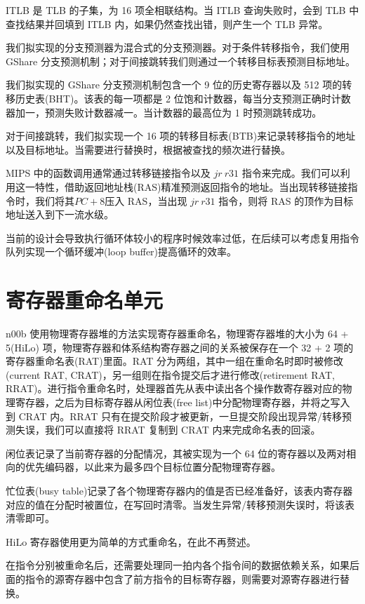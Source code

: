 \documentclass[blue,normal,cn]{elegantnote}
\begin{document}
ITLB 是 TLB 的子集，为 16 项全相联结构。当 ITLB 查询失败时，会到 TLB 中查找结果并回填到 ITLB 内，如果仍然查找出错，则产生一个 TLB 异常。

我们拟实现的分支预测器为混合式的分支预测器。对于条件转移指令，我们使用 GShare 分支预测机制；对于间接跳转我们则通过一个转移目标表预测目标地址。

我们拟实现的 GShare 分支预测机制包含一个 9 位的历史寄存器以及 512 项的转移历史表(BHT)。该表的每一项都是 2 位饱和计数器，每当分支预测正确时计数器加一，预测失败计数器减一。当计数器的最高位为 1 时预测跳转成功。

对于间接跳转，我们拟实现一个 16 项的转移目标表(BTB)来记录转移指令的地址以及目标地址。当需要进行替换时，根据被查找的频次进行替换。

MIPS 中的函数调用通常通过转移链接指令以及 $jr\ r31$ 指令来完成。我们可以利用这一特性，借助返回地址栈(RAS)精准预测返回指令的地址。当出现转移链接指令时，我们将其$PC + 8$压入 RAS，当出现 $jr\ r31$ 指令，则将 RAS 的顶作为目标地址送入到下一流水级。

当前的设计会导致执行循环体较小的程序时候效率过低，在后续可以考虑复用指令队列实现一个循环缓冲(loop buffer)提高循环的效率。

\section{寄存器重命名单元}

n00b 使用物理寄存器堆的方法实现寄存器重命名，物理寄存器堆的大小为 64 + 5(HiLo) 项，物理寄存器和体系结构寄存器之间的关系被保存在一个 32 + 2 项的寄存器重命名表(RAT)里面。RAT 分为两组，其中一组在重命名时即时被修改(current RAT, CRAT)，另一组则在指令提交后才进行修改(retirement RAT, RRAT)。进行指令重命名时，处理器首先从表中读出各个操作数寄存器对应的物理寄存器，之后为目标寄存器从闲位表(free list)中分配物理寄存器，并将之写入到 CRAT 内。RRAT 只有在提交阶段才被更新，一旦提交阶段出现异常/转移预测失误，我们可以直接将 RRAT 复制到 CRAT 内来完成命名表的回滚。

闲位表记录了当前寄存器的分配情况，其被实现为一个 64 位的寄存器以及两对相向的优先编码器，以此来为最多四个目标位置分配物理寄存器。

忙位表(busy table)记录了各个物理寄存器内的值是否已经准备好，该表内寄存器对应的值在分配时被置位，在写回时清零。当发生异常/转移预测失误时，将该表清零即可。

HiLo 寄存器使用更为简单的方式重命名，在此不再赘述。

在指令分别被重命名后，还需要处理同一拍内各个指令间的数据依赖关系，如果后面的指令的源寄存器中包含了前方指令的目标寄存器，则需要对源寄存器进行替换。
\end{document}
